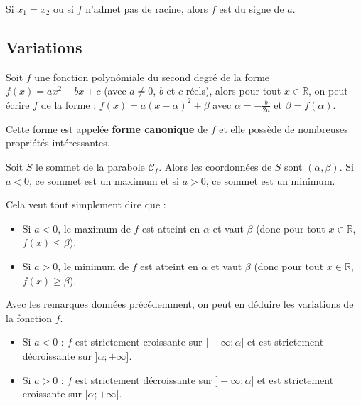 	\begin{tip}
		Si $x_1 = x_2$ ou si $f$ n'admet pas de racine, alors $f$ est du signe de $a$.
	\end{tip}

	\subsection{Variations}
	\label{variations}

	\begin{formula}
		Soit $f$ une fonction polynômiale du second degré de la forme $f(x) = ax^2 + bx +c$ (avec $a \neq 0$, $b$ et $c$ réels), alors pour tout $x \in \mathbb{R}$, on peut écrire $f$ de la forme :
		\newpar
		$f(x) = a(x - \alpha)^2 + \beta$ avec $\alpha = -\frac{b}{2a}$ et $\beta = f(\alpha)$.
	\end{formula}

	Cette forme est appelée \textbf{forme canonique} de $f$ et elle possède de nombreuses propriétés intéressantes.

	\begin{formula}
		Soit $S$ le sommet de la parabole $\mathcal{C}_f$. Alors les coordonnées de $S$ sont $(\alpha, \beta)$.
		\newline
		Si $a < 0$, ce sommet est un maximum et si $a > 0$, ce sommet est un minimum.
	\end{formula}

	\begin{tip}
		Cela veut tout simplement dire que :
		\begin{itemize}
			\item Si $a < 0$, le maximum de $f$ est atteint en $\alpha$ et vaut $\beta$ (donc pour tout $x \in \mathbb{R}$, $f(x) \leq \beta$).
			\item Si $a > 0$, le minimum de $f$ est atteint en $\alpha$ et vaut $\beta$ (donc pour tout $x \in \mathbb{R}$, $f(x) \geq \beta$).
		\end{itemize}
	\end{tip}

	Avec les remarques données précédemment, on peut en déduire les variations de la fonction $f$.

	\begin{formula}
		\entretitreetliste
		\begin{itemize}
			\item Si $a < 0$ : $f$ est strictement croissante sur $]-\infty; \alpha]$ et est strictement décroissante sur $]\alpha; +\infty]$.
			\item Si $a > 0$ : $f$ est strictement décroissante sur $]-\infty; \alpha]$ et est strictement croissante sur $]\alpha; +\infty]$.
		\end{itemize}
	\end{formula}

